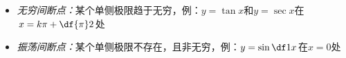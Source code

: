 \begin{enumerate}[(1)]
  \begin{itemize}
    \item {\it 无穷间断点：}某个单侧极限趋于无穷，例：$y=\tan x$和$y=\sec x$在$x=k\pi+\df{\pi}2$处
     \begin{center}
 	\end{center}
    \item {\it 振荡间断点：}某个单侧极限不存在，且非无穷，例：$y=\sin\df1x$在$x=0$处
    \begin{center}
 	\end{center}
  \end{itemize}
\end{enumerate}

